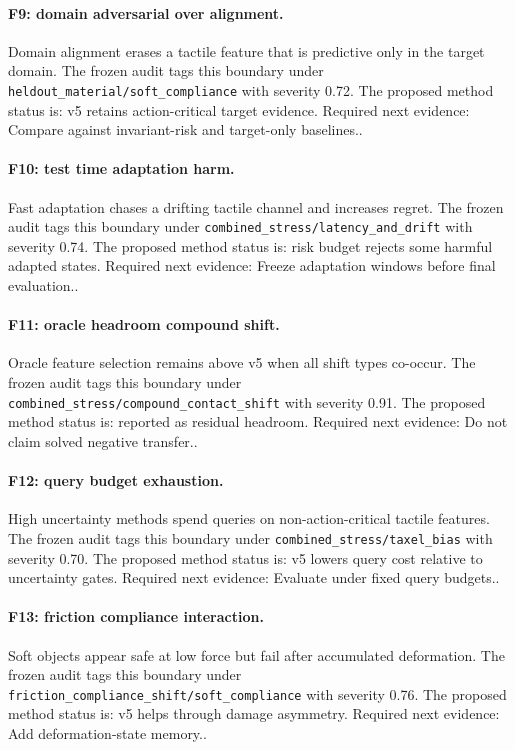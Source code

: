 \documentclass{article}
\begin{document}
\paragraph{F9: domain adversarial over alignment.} Domain alignment erases a tactile feature that is predictive only in the target domain. The frozen audit tags this boundary under \texttt{heldout\_material/soft\_compliance} with severity 0.72. The proposed method status is: v5 retains action-critical target evidence. Required next evidence: Compare against invariant-risk and target-only baselines..

\paragraph{F10: test time adaptation harm.} Fast adaptation chases a drifting tactile channel and increases regret. The frozen audit tags this boundary under \texttt{combined\_stress/latency\_and\_drift} with severity 0.74. The proposed method status is: risk budget rejects some harmful adapted states. Required next evidence: Freeze adaptation windows before final evaluation..

\paragraph{F11: oracle headroom compound shift.} Oracle feature selection remains above v5 when all shift types co-occur. The frozen audit tags this boundary under \texttt{combined\_stress/compound\_contact\_shift} with severity 0.91. The proposed method status is: reported as residual headroom. Required next evidence: Do not claim solved negative transfer..

\paragraph{F12: query budget exhaustion.} High uncertainty methods spend queries on non-action-critical tactile features. The frozen audit tags this boundary under \texttt{combined\_stress/taxel\_bias} with severity 0.70. The proposed method status is: v5 lowers query cost relative to uncertainty gates. Required next evidence: Evaluate under fixed query budgets..

\paragraph{F13: friction compliance interaction.} Soft objects appear safe at low force but fail after accumulated deformation. The frozen audit tags this boundary under \texttt{friction\_compliance\_shift/soft\_compliance} with severity 0.76. The proposed method status is: v5 helps through damage asymmetry. Required next evidence: Add deformation-state memory..
\end{document}
